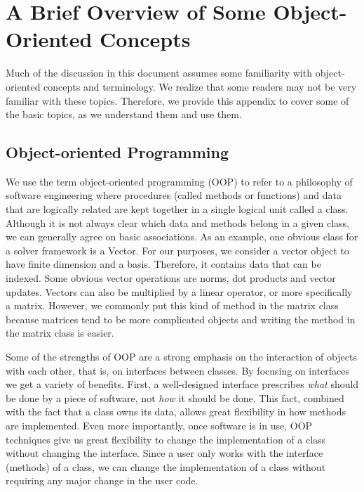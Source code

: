 \documentclass[12pt,relax]{SANDreport}
\begin{document}
    \clearpage
    
    


    \appendix
\section{A Brief Overview of Some Object-Oriented Concepts}
\label{sect:OOTutorial}

Much of the discussion in this document assumes some familiarity with
object-oriented	concepts and terminology. We realize that some readers may not
be very familiar with these topics. Therefore, we provide this appendix to
cover some of the basic topics, as we understand them and use them.

\subsection{Object-oriented Programming}
We use the term object-oriented programming (OOP) to refer to a philosophy of 
software engineering where procedures (called methods or functions) and data
that are logically related are kept together in a single logical unit called a
class.  Although it is not always clear which data and methods belong in a
given class, we can generally agree on basic associations.  As an example, one
obvious class for a solver framework is a Vector.  For our purposes, we
consider a vector object to have finite dimension and a basis.  Therefore, it
contains data that can be indexed.  Some obvious vector operations are norms,
dot products and vector updates.  Vectors can also be multiplied by a linear operator,
or more specifically a matrix.  However, we commonly put this kind of method in the matrix
class because matrices tend to be more complicated objects and writing the method in the matrix
class is easier.

Some of the strengths of OOP are a strong emphasis on the interaction of objects with each
other, that is, on interfaces between classes.  By focusing on interfaces we get a variety of
benefits.  First, a well-designed interface prescribes {\it what} should be done by a piece of
software, not {\it how} it should be done.  This fact, combined with the fact that a class
owns its data, allows great flexibility in how methods are implemented.  Even more importantly,
once software is in use, OOP techniques give us great flexibility to change the implementation
of a class without changing the interface.  Since a user only works with the interface 
(methods) of a class, we can change the implementation of a class without requiring any major
change in the user code.  
\end{document}
